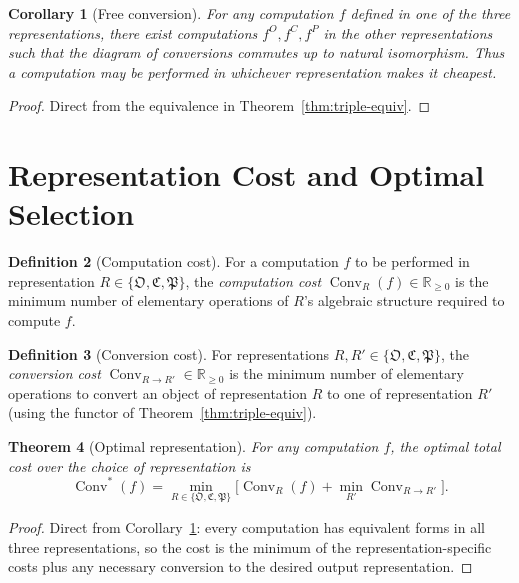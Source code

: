 \documentclass[11pt,a4paper]{article}
\theoremstyle{thmstyle}
\newtheorem{theorem}{Theorem}[section]
\newtheorem{corollary}[theorem]{Corollary}
\theoremstyle{thmstyle}
\theoremstyle{definition}
\newtheorem{definition}[theorem]{Definition}
\theoremstyle{remark}
\DeclareMathOperator{\Conv}{Conv}
\newcommand{\Real}{\mathbb{R}}
\newcommand{\Osc}{\mathfrak{O}}
\newcommand{\Cat}{\mathfrak{C}}
\newcommand{\Part}{\mathfrak{P}}
\newcommand{\Cat}{\mathfrak{C}}
\begin{document}
\begin{corollary}[Free conversion]\label{cor:free-conversion}
For any computation $f$ defined in one of the three
representations, there exist computations $f^{O}, f^{C},
f^{P}$ in the other representations such that the
diagram of conversions commutes up to natural
isomorphism.  Thus a computation may be performed in
whichever representation makes it cheapest.
\end{corollary}

\begin{proof}
Direct from the equivalence in Theorem~\ref{thm:triple-equiv}.
\end{proof}

\section{Representation Cost and Optimal Selection}
\label{sec:rep-cost}

\begin{definition}[Computation cost]\label{def:comp-cost}
For a computation $f$ to be performed in representation
$R \in \{\Osc, \Cat, \Part\}$, the
\emph{computation cost}
$\Conv_{R}(f) \in \Real_{\geq 0}$ is the minimum
number of elementary operations of $R$'s algebraic
structure required to compute $f$.
\end{definition}

\begin{definition}[Conversion cost]\label{def:conv-cost}
For representations $R, R' \in \{\Osc, \Cat, \Part\}$,
the \emph{conversion cost}
$\Conv_{R \to R'} \in \Real_{\geq 0}$ is the minimum
number of elementary operations to convert an object
of representation $R$ to one of representation $R'$
(using the functor of Theorem~\ref{thm:triple-equiv}).
\end{definition}

\begin{theorem}[Optimal representation]\label{thm:opt-rep}
For any computation $f$, the optimal total cost over
the choice of representation is
\[
\Conv^{*}(f) = \min_{R \in \{\Osc, \Cat, \Part\}}
   \bigl[\Conv_{R}(f) +
          \min_{R'}\Conv_{R \to R'}\bigr].
\]
\end{theorem}

\begin{proof}
Direct from Corollary~\ref{cor:free-conversion}: every
computation has equivalent forms in all three
representations, so the cost is the minimum of the
representation-specific costs plus any necessary
conversion to the desired output representation.
\end{proof}
\end{document}
